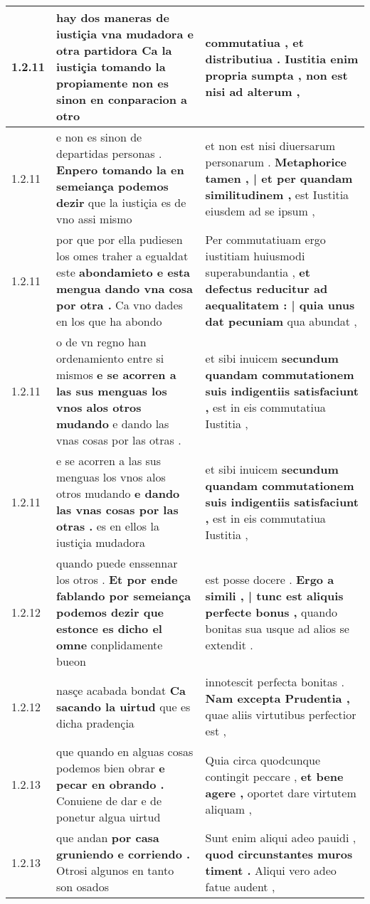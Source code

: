 \begin{tabular}{|p{1cm}|p{6.5cm}|p{6.5cm}|}
1.2.11 & hay dos maneras de iustiçia vna mudadora e otra partidora \textbf{ Ca la iustiçia tomando la } propiamente non es sinon en conparacion a otro & commutatiua , et distributiua . \textbf{ Iustitia enim propria sumpta , } non est nisi ad alterum , \\\hline
1.2.11 & e non es sinon de departidas personas . \textbf{ Enpero tomando la en semeiança podemos dezir } que la iustiçia es de vno assi mismo & et non est nisi diuersarum personarum . \textbf{ Metaphorice tamen , | et per quandam similitudinem , } est Iustitia eiusdem ad se ipsum , \\\hline
1.2.11 & por que por ella pudiesen los omes traher a egualdat este \textbf{ abondamieto e esta mengua dando vna cosa por otra . } Ca vno dades en los que ha abondo & Per commutatiuam ergo iustitiam huiusmodi superabundantia , \textbf{ et defectus reducitur ad aequalitatem : | quia unus dat pecuniam } qua abundat , \\\hline
1.2.11 & o de vn regno han ordenamiento entre si mismos \textbf{ e se acorren a las sus menguas los vnos alos otros mudando } e dando las vnas cosas por las otras . & et sibi inuicem \textbf{ secundum quandam commutationem suis indigentiis satisfaciunt , } est in eis commutatiua Iustitia , \\\hline
1.2.11 & e se acorren a las sus menguas los vnos alos otros mudando \textbf{ e dando las vnas cosas por las otras . } es en ellos la iustiçia mudadora & et sibi inuicem \textbf{ secundum quandam commutationem suis indigentiis satisfaciunt , } est in eis commutatiua Iustitia , \\\hline
1.2.12 & quando puede enssennar los otros . \textbf{ Et por ende fablando por semeiança podemos dezir que estonce es dicho el omne } conplidamente bueon & est posse docere . \textbf{ Ergo a simili , | tunc est aliquis perfecte bonus , } quando bonitas sua usque ad alios se extendit . \\\hline
1.2.12 & nasçe acabada bondat \textbf{ Ca sacando la uirtud } que es dicha pradençia & innotescit perfecta bonitas . \textbf{ Nam excepta Prudentia , } quae aliis virtutibus perfectior est , \\\hline
1.2.13 & que quando en alguas cosas podemos bien obrar \textbf{ e pecar en obrando . } Conuiene de dar e de ponetur algua uirtud & Quia circa quodcunque contingit peccare , \textbf{ et bene agere , } oportet dare virtutem aliquam , \\\hline
1.2.13 & que andan \textbf{ por casa gruniendo e corriendo . } Otrosi algunos en tanto son osados & Sunt enim aliqui adeo pauidi , \textbf{ quod circunstantes muros timent . } Aliqui vero adeo fatue audent , \\\hline

\end{tabular}
